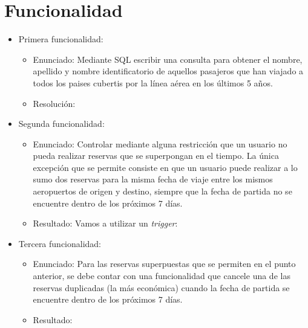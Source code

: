 \section{Funcionalidad}

\begin{itemize}
	\item Primera funcionalidad:
		\begin{itemize}
			\item Enunciado: Mediante SQL escribir una consulta para obtener el nombre, apellido y nombre
			identificatorio de aquellos pasajeros que han viajado a todos los paises cubertis por la l\'inea
			a\'erea en los \'ultimos 5 a\~nos.

			\item Resoluci\'on:

			
		\end{itemize}
	\item Segunda funcionalidad:
		\begin{itemize}
			\item Enunciado: Controlar mediante alguna restricci\'on que un usuario no pueda realizar
			reservas que se superpongan en el tiempo. La \'unica excepci\'on que se permite consiste en
			que un usuario puede realizar a lo sumo dos reservas para la misma fecha de viaje entre los
			mismos aeropuertos de origen y destino, siempre que la fecha de partida no se encuentre dentro
			de los pr\'oximos 7 d\'ias.
			\item Resultado: Vamos a utilizar un \textit{trigger}:

			
		\end{itemize}
	\item Tercera funcionalidad:
		\begin{itemize}
			\item Enunciado: Para las reservas superpuestas que se permiten en el punto anterior, se debe
			contar con una funcionalidad que cancele una de las reservas duplicadas (la m\'as econ\'omica)
			cuando la fecha de partida se encuentre dentro de los pr\'oximos 7 d\'ias.
			
			\item Resultado:
			
			
		\end{itemize}
\end{itemize}

